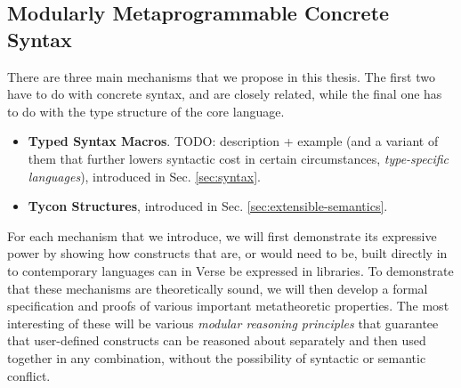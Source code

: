 \subsection{Modularly Metaprogrammable Concrete Syntax}
There are three main mechanisms that we propose in this thesis. The first two have to do with concrete syntax, and are closely related, while the final one has to do with the type structure of the core language. 
\begin{itemize}
\item \textbf{Typed Syntax Macros}. TODO: description + example (and a variant of them that further lowers syntactic cost in certain circumstances, \emph{type-specific languages}), introduced in Sec. \ref{sec:syntax}.
\item \textbf{Tycon Structures}, introduced in Sec. \ref{sec:extensible-semantics}. 
\end{itemize}
For each mechanism that we introduce, we will first demonstrate its expressive power by showing how constructs that are, or would need to be, built directly in to contemporary languages can in Verse be expressed in libraries. To demonstrate that these mechanisms are theoretically sound, we will then develop a formal specification and proofs of various important metatheoretic properties. The most interesting of these will be various \emph{modular reasoning principles} that guarantee that user-defined constructs can be reasoned about separately and then used together in any combination, without the possibility of syntactic or semantic conflict. 




